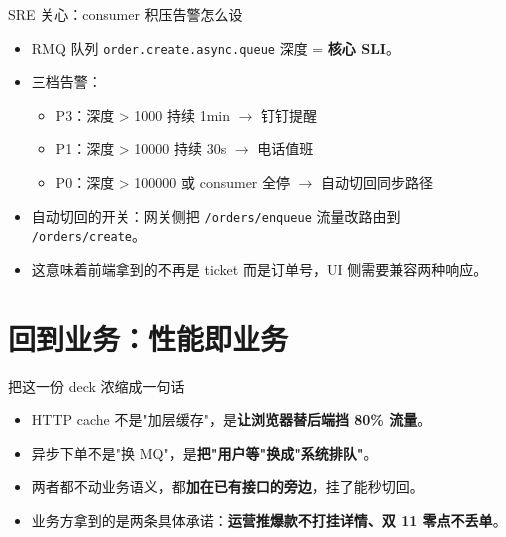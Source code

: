\begin{frame}{SRE 关心：consumer 积压告警怎么设}
\begin{itemize}
  \item RMQ 队列 \texttt{order.create.async.queue} 深度 = \textbf{核心 SLI}。
  \item 三档告警：
  \begin{itemize}
    \item P3：深度 > 1000 持续 1min $\to$ 钉钉提醒
    \item P1：深度 > 10000 持续 30s $\to$ 电话值班
    \item P0：深度 > 100000 或 consumer 全停 $\to$ 自动切回同步路径
  \end{itemize}
  \item 自动切回的开关：网关侧把 \texttt{/orders/enqueue} 流量改路由到 \texttt{/orders/create}。
  \item 这意味着前端拿到的不再是 ticket 而是订单号，UI 侧需要兼容两种响应。
\end{itemize}
\end{frame}

\section{回到业务：性能即业务}

\begin{frame}{把这一份 deck 浓缩成一句话}
\begin{itemize}
  \item HTTP cache 不是"加层缓存"，是\textbf{让浏览器替后端挡 80\% 流量}。
  \item 异步下单不是"换 MQ"，是\textbf{把"用户等"换成"系统排队"}。
  \item 两者都不动业务语义，都\textbf{加在已有接口的旁边}，挂了能秒切回。
  \item 业务方拿到的是两条具体承诺：\textbf{运营推爆款不打挂详情、双 11 零点不丢单}。
\end{itemize}
\end{frame}

\appendix

